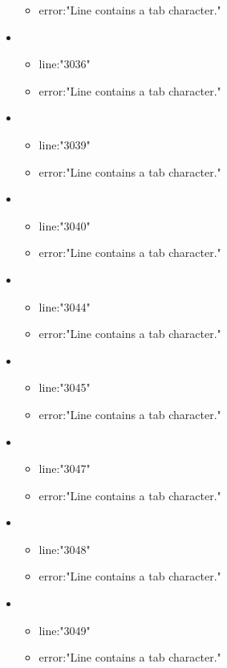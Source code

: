 \begin{itemize}
\begin{itemize}
		\item error:"Line contains a tab character." 
	\end{itemize}
	\item 
	\begin{itemize} 
		\item line:"3036" 
		\item error:"Line contains a tab character." 
	\end{itemize}
	\item 
	\begin{itemize} 
		\item line:"3039" 
		\item error:"Line contains a tab character." 
	\end{itemize}
	\item 
	\begin{itemize} 
		\item line:"3040" 
		\item error:"Line contains a tab character." 
	\end{itemize}
	\item 
	\begin{itemize} 
		\item line:"3044" 
		\item error:"Line contains a tab character." 
	\end{itemize}
	\item 
	\begin{itemize} 
		\item line:"3045" 
		\item error:"Line contains a tab character." 
	\end{itemize}
	\item 
	\begin{itemize} 
		\item line:"3047" 
		\item error:"Line contains a tab character." 
	\end{itemize}
	\item 
	\begin{itemize} 
		\item line:"3048" 
		\item error:"Line contains a tab character." 
	\end{itemize}
	\item 
	\begin{itemize} 
		\item line:"3049" 
		\item error:"Line contains a tab character." 
	\end{itemize}

\end{itemize}
